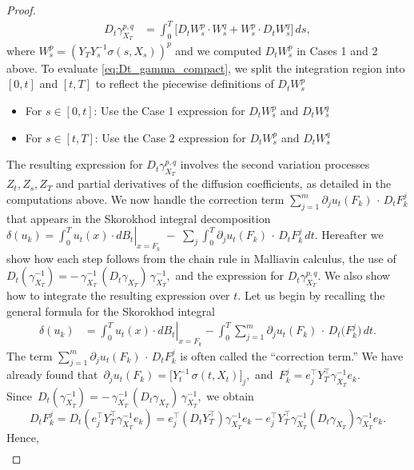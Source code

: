 \documentclass[]{interact}
\newcommand{\1}{\mathbf{1}}
\theoremstyle{plain}%
\theoremstyle{definition}
\theoremstyle{remark}
\numberwithin{equation}{section}
\begin{document}
\begin{proof}
\begin{align}
D_t \gamma_{X_T}^{p,q} &= \int_0^T \Big[ D_t W_s^p \cdot W_s^q + W_s^p \cdot D_t W_s^q \Big]\,ds,
\label{eq:Dt_gamma_compact}
\end{align}
where $W_s^p = (Y_T Y_s^{-1} \sigma(s, X_s))^p$ and we computed $D_t W_s^p$ in Cases 1 and 2 above.
%
To evaluate \eqref{eq:Dt_gamma_compact}, we split the integration region into $[0,t]$ and $[t,T]$ to reflect the piecewise definitions of $D_t W_s^p$
\begin{itemize}
\item For $s \in [0,t]$: Use the Case 1 expression for $D_t W_s^p$ and $D_t W_s^q$
\item For $s \in [t,T]$: Use the Case 2 expression for $D_t W_s^p$ and $D_t W_s^q$
\end{itemize}
%
The resulting expression for $D_t \gamma_{X_T}^{p,q}$ involves the second variation processes $Z_t, Z_s, Z_T$ and partial derivatives of the diffusion coefficients, as detailed in the computations above.
%
%
We now handle the correction term 
\(\displaystyle \sum_{j=1}^m \partial_j u_t(F_k) \,\cdot\, D_t F_k^j\) 
that appears in the Skorokhod integral decomposition
$\delta(u_k) = \left. \int_0^T u_t(x) \cdot dB_t \right|_{x=F_k} \;-\;\sum_j \int_0^T \partial_j u_t(F_k)\,\cdot\,D_tF_k^j\,dt$.
%
Hereafter we show how each step follows from the chain rule in 
Malliavin calculus, the use of 
\(\displaystyle D_t (\gamma_{X_T}^{-1}) = -\,\gamma_{X_T}^{-1}\,(D_t \gamma_{X_T})\,\gamma_{X_T}^{-1},\) 
and the expression for 
\(\displaystyle D_t \gamma_{X_T}^{p,q}\). 
We also show how to integrate the resulting expression over \(t\). 
%
Let us begin by recalling the general formula for the Skorokhod integral
\begin{align*}
\delta(u_k) 
&= \left. \int_0^T u_t(x)\cdot dB_t \right|_{x=F_k} - \int_0^T \sum_{j=1}^m \partial_j u_t(F_k) \,\cdot\, D_t \bigl(F_k^j\bigr) \,dt.
\end{align*}
The term 
\(\displaystyle \sum_{j=1}^m \partial_j u_t(F_k) \,\cdot\,D_t F_k^j\)
is often called the ``correction term.''  
We have already found  that 
\(\,\partial_j u_t(F_k) = \bigl[Y_t^{-1}\,\sigma(t, X_t)\bigr]_j,\) 
and 
\(\,F_k^j = e_j^\top Y_T^\top \gamma_{X_T}^{-1} e_k.\)  
\\Since 
\(\,D_t(\gamma_{X_T}^{-1}) = -\,\gamma_{X_T}^{-1}\,(D_t\gamma_{X_T})\,\gamma_{X_T}^{-1},\) 
we obtain
\[
D_t F_k^j = D_t(e_j^\top Y_T^\top \gamma_{X_T}^{-1} e_k) 
= e_j^\top (D_t Y_T^\top) \gamma_{X_T}^{-1} e_k - e_j^\top Y_T^\top \gamma_{X_T}^{-1} (D_t \gamma_{X_T}) \gamma_{X_T}^{-1} e_k.
\]
Hence,
\begin{align}

\end{align}
\end{proof}
\end{document}
